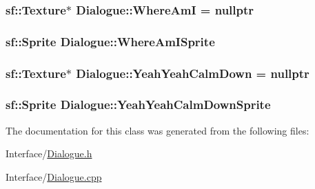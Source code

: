 \subsubsection[{\texorpdfstring{Where\+AmI}{WhereAmI}}]{\setlength{\rightskip}{0pt plus 5cm}sf\+::\+Texture$\ast$ Dialogue\+::\+Where\+AmI = nullptr\hspace{0.3cm}{\ttfamily [protected]}}\hypertarget{classDialogue_aea8f799a49bbd52aa97d06be06d2df78}{}\label{classDialogue_aea8f799a49bbd52aa97d06be06d2df78}
\subsubsection[{\texorpdfstring{Where\+Am\+I\+Sprite}{WhereAmISprite}}]{\setlength{\rightskip}{0pt plus 5cm}sf\+::\+Sprite Dialogue\+::\+Where\+Am\+I\+Sprite\hspace{0.3cm}{\ttfamily [protected]}}\hypertarget{classDialogue_a1f385137c38c6adee1eef6f32f4abefd}{}\label{classDialogue_a1f385137c38c6adee1eef6f32f4abefd}
\subsubsection[{\texorpdfstring{Yeah\+Yeah\+Calm\+Down}{YeahYeahCalmDown}}]{\setlength{\rightskip}{0pt plus 5cm}sf\+::\+Texture$\ast$ Dialogue\+::\+Yeah\+Yeah\+Calm\+Down = nullptr\hspace{0.3cm}{\ttfamily [protected]}}\hypertarget{classDialogue_a76c288944980116289e0f82fe8e03cd6}{}\label{classDialogue_a76c288944980116289e0f82fe8e03cd6}
\subsubsection[{\texorpdfstring{Yeah\+Yeah\+Calm\+Down\+Sprite}{YeahYeahCalmDownSprite}}]{\setlength{\rightskip}{0pt plus 5cm}sf\+::\+Sprite Dialogue\+::\+Yeah\+Yeah\+Calm\+Down\+Sprite\hspace{0.3cm}{\ttfamily [protected]}}\hypertarget{classDialogue_ad95300bae2b0ffbd0f104c1450a47f10}{}\label{classDialogue_ad95300bae2b0ffbd0f104c1450a47f10}


The documentation for this class was generated from the following files\+:\begin{DoxyCompactItemize}
\item 
Interface/\hyperlink{Dialogue_8h}{Dialogue.\+h}\item 
Interface/\hyperlink{Dialogue_8cpp}{Dialogue.\+cpp}\end{DoxyCompactItemize}
